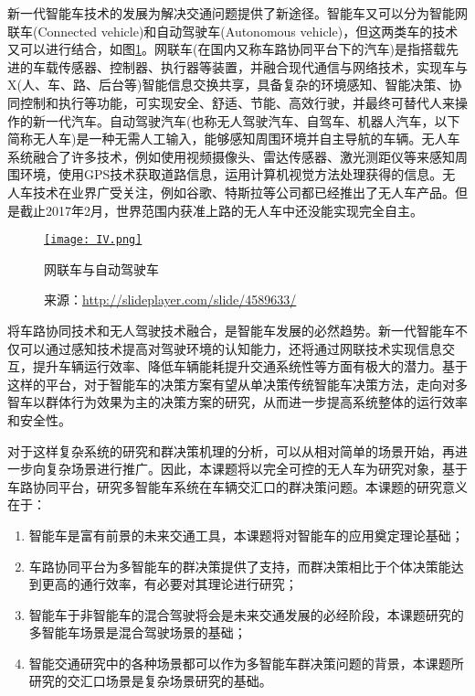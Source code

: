   新一代智能车技术的发展为解决交通问题提供了新途径。智能车又可以分为智能网联车(Connected vehicle)和自动驾驶车(Autonomous vehicle)，但这两类车的技术又可以进行结合，如图\ref{fig:IV}。网联车(在国内又称车路协同平台下的汽车)是指搭载先进的车载传感器、控制器、执行器等装置，并融合现代通信与网络技术，实现车与X(人、车、路、后台等)智能信息交换共享，具备复杂的环境感知、智能决策、协同控制和执行等功能，可实现安全、舒适、节能、高效行驶，并最终可替代人来操作的新一代汽车。自动驾驶汽车(也称无人驾驶汽车、自驾车、机器人汽车\cite{Thrun2010Toward}，以下简称无人车)是一种无需人工输入，能够感知周围环境并自主导航的车辆。无人车系统融合了许多技术，例如使用视频摄像头、雷达传感器、激光测距仪等来感知周围环境，使用GPS技术获取道路信息，运用计算机视觉方法处理获得的信息。无人车技术在业界广受关注，例如谷歌\cite{google2017self}、特斯拉\cite{tesla2017model}等公司都已经推出了无人车产品。但是截止2017年2月，世界范围内获准上路的无人车中还没能实现完全自主。

  \begin{figure}
  \centering
  \href{http://slideplayer.com/slide/4589633/}{\texttt{[image: IV.png]}}
  \caption{网联车与自动驾驶车}
  \label{fig:IV}
  \caption*{来源：\url{http://slideplayer.com/slide/4589633/}}
  \end{figure}

  将车路协同技术和无人驾驶技术融合，是智能车发展的必然趋势。新一代智能车不仅可以通过感知技术提高对驾驶环境的认知能力，还将通过网联技术实现信息交互，提升车辆运行效率、降低车辆能耗提升交通系统性等方面有极大的潜力。基于这样的平台，对于智能车的决策方案有望从单决策传统智能车决策方法，走向对多智车以群体行为效果为主的决策方案的研究，从而进一步提高系统整体的运行效率和安全性。

  对于这样复杂系统的研究和群决策机理的分析，可以从相对简单的场景开始，再进一步向复杂场景进行推广。因此，本课题将以完全可控的无人车为研究对象，基于车路协同平台，研究多智能车系统在车辆交汇口的群决策问题。本课题的研究意义在于：

  \begin{enumerate}[label=(\arabic*)]
  \item 智能车是富有前景的未来交通工具，本课题将对智能车的应用奠定理论基础；
  \item 车路协同平台为多智能车的群决策提供了支持，而群决策相比于个体决策能达到更高的通行效率，有必要对其理论进行研究；
  \item 智能车于非智能车的混合驾驶将会是未来交通发展的必经阶段，本课题研究的多智能车场景是混合驾驶场景的基础；
  \item 智能交通研究中的各种场景都可以作为多智能车群决策问题的背景，本课题所研究的交汇口场景是复杂场景研究的基础。
  \end{enumerate}

